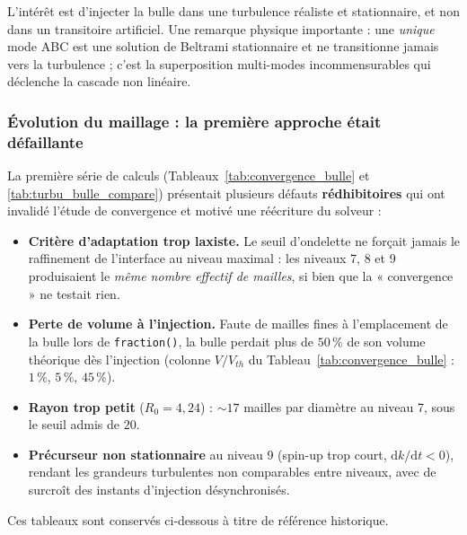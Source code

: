 L'intérêt est d'injecter la bulle dans une turbulence réaliste et stationnaire, et non dans
un transitoire artificiel. Une remarque physique importante : une \emph{unique} mode ABC est
une solution de Beltrami stationnaire et ne transitionne jamais vers la turbulence ; c'est la
superposition multi-modes incommensurables qui déclenche la cascade non linéaire.

\subsubsection{Évolution du maillage : la première approche était défaillante}

La première série de calculs (Tableaux~\ref{tab:convergence_bulle} et
\ref{tab:turbu_bulle_compare}) présentait plusieurs défauts \textbf{rédhibitoires} qui ont
invalidé l'étude de convergence et motivé une réécriture du solveur :

\begin{itemize}
    \item \textbf{Critère d'adaptation trop laxiste.} Le seuil d'ondelette ne forçait jamais
    le raffinement de l'interface au niveau maximal : les niveaux 7, 8 et 9 produisaient le
    \emph{même nombre effectif de mailles}, si bien que la « convergence » ne testait rien.
    \item \textbf{Perte de volume à l'injection.} Faute de mailles fines à l'emplacement de la
    bulle lors de \texttt{fraction()}, la bulle perdait plus de $50\,\%$ de son volume
    théorique dès l'injection (colonne $V/V_{th}$ du Tableau~\ref{tab:convergence_bulle} :
    $1\,\%$, $5\,\%$, $45\,\%$).
    \item \textbf{Rayon trop petit} ($R_0 = 4{,}24$) : $\sim 17$ mailles par diamètre au
    niveau 7, sous le seuil admis de $20$.
    \item \textbf{Précurseur non stationnaire} au niveau 9 (spin-up trop court,
    $\mathrm{d}k/\mathrm{d}t < 0$), rendant les grandeurs turbulentes non comparables entre
    niveaux, avec de surcroît des instants d'injection désynchronisés.
\end{itemize}

Ces tableaux sont conservés ci-dessous à titre de référence historique.


